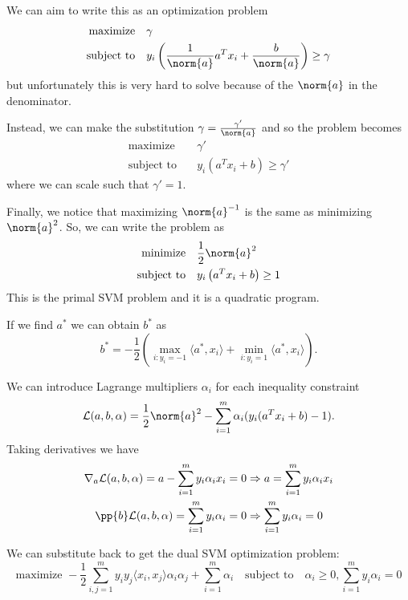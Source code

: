 \documentclass[11pt]{article}
\begin{document}
We can aim to write this as an optimization problem 
\begin{align*}
    \text{maximize} \quad & \gamma \\
    \text{subject to} \quad & y_i \left( \frac{1}{\norm{a}}a^Tx_i + \frac{b}{\norm{a}} \right) \geq \gamma
\end{align*}
but unfortunately this is very hard to solve because of the $\norm{a}$ in the denominator. \par

Instead, we can make the substitution $\gamma = \frac{\gamma'}{\norm{a}}$ and so the problem becomes
\begin{align*}
    \text{maximize} \quad & \gamma' \\
    \text{subject to} \quad & y_i \left( a^Tx_i + b \right) \geq \gamma'
\end{align*}
where we can scale such that $\gamma' = 1$. \par

Finally, we notice that maximizing $\norm{a}^{-1}$ is the same as minimizing $\norm{a}^2$. So, we can write the problem as
\begin{align*}
    \text{minimize} \quad & \frac{1}{2} \norm{a}^2 \\
    \text{subject to} \quad & y_i \left( a^Tx_i + b \right) \geq 1
\end{align*}
This is the primal SVM problem and it is a quadratic program. \par 

If we find $a^*$ we can obtain $b^*$ as 
\[ b^* = -\frac{1}{2} \left( \max\limits_{i:y_i=-1} \langle a^*, x_i \rangle + \min_{i:y_i=1} \langle a^*, x_i \rangle \right). \] 

We can introduce Lagrange multipliers $\alpha_i$ for each inequality constraint 
\[ \mathcal{L}(a, b, \alpha) = \frac{1}{2}\norm{a}^2 - \sum_{i=1}^m \alpha_i (y_i(a^Tx_i + b) - 1). \] 
Taking derivatives we have 
\begin{align*}
    \nabla_a \mathcal{L}(a, b, \alpha) = a - \sum_{i=1}^m y_i\alpha_ix_i = 0 &\Rightarrow a = \sum_{i=1}^m y_i\alpha_ix_i \\
    \pp{b} \mathcal{L}(a, b, \alpha) = \sum_{i=1}^m y_i\alpha_i = 0 &\Rightarrow \sum_{i=1}^m y_i\alpha_i = 0 
\end{align*}

We can substitute back to get the dual SVM optimization problem: 
\[ \text{maximize } -\frac{1}{2} \sum_{i,j=1}^m y_iy_j \langle x_i, x_j \rangle \alpha_i \alpha_j + \sum_{i=1}^m \alpha_i \quad \text{subject to} \quad \alpha_i \geq 0, \sum_{i=1}^m y_i\alpha_i = 0 \] 
\end{document}
